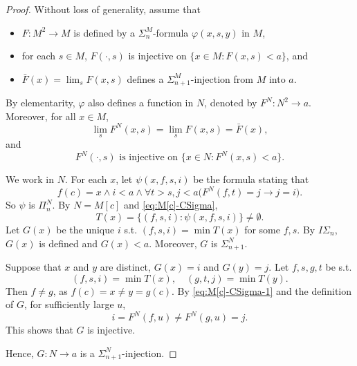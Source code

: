 \documentclass[twoside,a4paper]{amsart}
\theoremstyle{definition}
\theoremstyle{theorem}
\numberwithin{equation}{section}
\newcommand{\<}{\langle}
\renewcommand{\>}{\rangle}
\begin{document}
\begin{proof}
Without loss of generality, assume that 
\begin{itemize}
 \item $F: M^2 \to M$ is defined by a $\Sigma_n^M$-formula $\varphi(x,s,y)$ in $M$,
 \item for each $s \in M$, $F(\cdot,s)$ is injective on $\{x \in M: F(x,s) < a\}$, and
 \item $\bar{F}(x) = \lim_s F(x,s)$ defines a $\Sigma_{n+1}^M$-injection from $M$ into $a$.
\end{itemize}
By elementarity, $\varphi$ also defines a function in $N$, denoted by $F^N: N^2 \to a$.
Moreover, for all $x \in M$,
\begin{equation}\label{eq:M[c]-CSigma}
  \lim_s F^N(x,s) = \lim_s F(x,s) = \bar{F}(x),
\end{equation}
and
\begin{equation}\label{eq:M[c]-CSigma-1}
  F^N(\cdot,s) \text{ is injective on } \{x \in N: F^N(x,s) < a\}.
\end{equation}

We work in $N$.
For each $x$, let $\psi(x,f,s,i)$ be the formula stating that
\[
  f(c) = x \wedge i < a \wedge \forall t > s, j < a \big( F^N(f,t) = j \to j = i \big).
\]
So $\psi$ is $\Pi_n^N$.
By $N = M[c]$ and \eqref{eq:M[c]-CSigma},
\[
  T(x) = \{(f,s,i): \psi(x,f,s,i)\} \neq \emptyset.
\]
Let $G(x)$ be the unique $i$ s.t. $(f,s,i) = \min T(x)$ for some $f,s$.
By $I\Sigma_n$, $G(x)$ is defined and $G(x) < a$.
Moreover, $G$ is $\Sigma_{n+1}^N$.

Suppose that $x$ and $y$ are distinct, $G(x) = i$ and $G(y) = j$.
Let $f,s,g,t$ be s.t.
\[
  (f,s,i) = \min T(x),\quad (g,t,j) = \min T(y).
\]
Then $f \neq g$, as $f(c) = x \neq y = g(c)$.
By \eqref{eq:M[c]-CSigma-1} and the definition of $G$, for sufficiently large $u$,
\[
  i = F^N(f,u) \neq F^N(g,u) = j.
\]
This shows that $G$ is injective.

Hence, $G: N \to a$ is a $\Sigma_{n+1}^N$-injection.
\end{proof}
\end{document}
